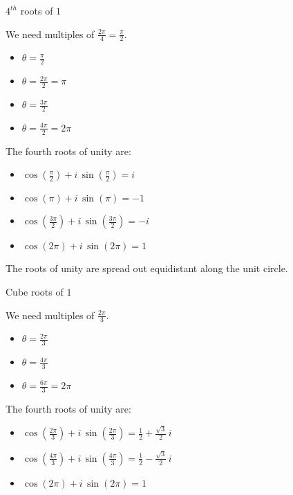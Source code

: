 \documentclass{ximera}
\begin{document}
\begin{example}  $4^{th}$ roots of $1$

We need multiples of $\frac{2 \pi}{4} = \frac{\pi}{2}$.

\begin{itemize}
\item $\theta = \frac{\pi}{2}$
\item $\theta = \frac{2 \pi}{2} = \pi$
\item $\theta = \frac{3 \pi}{2}$
\item $\theta = \frac{4 \pi}{2} = 2 \pi$
\end{itemize}



The fourth roots of unity are:
\begin{itemize}
\item $\cos\left(\frac{\pi}{2}\right) + i \, \sin\left(\frac{\pi}{2}\right) = i$
\item $\cos(\pi) + i \, \sin(\pi) = -1$
\item $\cos\left(\frac{3 \pi}{2}\right) + i \, \sin\left(\frac{3 \pi}{2}\right) = -i$
\item $\cos(2 \pi) + i \, \sin(2 \pi) = 1$
\end{itemize}





The roots of unity are spread out equidistant along the unit circle.






\end{example}










\begin{example}  Cube roots of $1$

We need multiples of $\frac{2 \pi}{3}$.

\begin{itemize}
\item $\theta = \frac{2 \pi}{3}$
\item $\theta = \frac{4 \pi}{3}$
\item $\theta = \frac{6 \pi}{3} = 2 \pi$
\end{itemize}



The fourth roots of unity are:
\begin{itemize}
\item $\cos\left(\frac{2 \pi}{3}\right) + i \, \sin\left(\frac{2 \pi}{3}\right) = \frac{1}{2} + \frac{\sqrt{3}}{2} \, i$
\item $\cos\left(\frac{4 \pi}{3}\right) + i \, \sin\left(\frac{4 \pi}{3}\right) = \frac{1}{2} - \frac{\sqrt{3}}{2} \, i$
\item $\cos(2 \pi) + i \, \sin(2 \pi) = 1$
\end{itemize}



\end{example}
\end{document}
